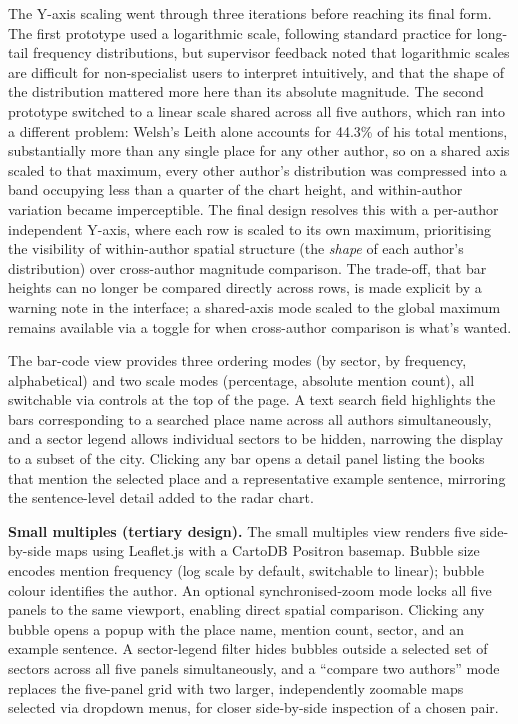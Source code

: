 \documentclass[logo,msc]{infthesis}
\begin{document}
The Y-axis scaling went through three iterations before reaching its final form. The first prototype used a logarithmic scale, following standard practice for long-tail frequency distributions, but supervisor feedback noted that logarithmic scales are difficult for non-specialist users to interpret intuitively, and that the shape of the distribution mattered more here than its absolute magnitude. The second prototype switched to a linear scale shared across all five authors, which ran into a different problem: Welsh's Leith alone accounts for 44.3\% of his total mentions, substantially more than any single place for any other author, so on a shared axis scaled to that maximum, every other author's distribution was compressed into a band occupying less than a quarter of the chart height, and within-author variation became imperceptible. The final design resolves this with a per-author independent Y-axis, where each row is scaled to its own maximum, prioritising the visibility of within-author spatial structure (the \emph{shape} of each author's distribution) over cross-author magnitude comparison. The trade-off, that bar heights can no longer be compared directly across rows, is made explicit by a warning note in the interface; a shared-axis mode scaled to the global maximum remains available via a toggle for when cross-author comparison is what's wanted.
 
The bar-code view provides three ordering modes (by sector, by frequency, alphabetical) and two scale modes (percentage, absolute mention count), all switchable via controls at the top of the page. A text search field highlights the bars corresponding to a searched place name across all authors simultaneously, and a sector legend allows individual sectors to be hidden, narrowing the display to a subset of the city. Clicking any bar opens a detail panel listing the books that mention the selected place and a representative example sentence, mirroring the sentence-level detail added to the radar chart.
 
\textbf{Small multiples (tertiary design).} The small multiples view renders five side-by-side maps using Leaflet.js with a CartoDB Positron basemap. Bubble size encodes mention frequency (log scale by default, switchable to linear); bubble colour identifies the author. An optional synchronised-zoom mode locks all five panels to the same viewport, enabling direct spatial comparison. Clicking any bubble opens a popup with the place name, mention count, sector, and an example sentence. A sector-legend filter hides bubbles outside a selected set of sectors across all five panels simultaneously, and a ``compare two authors'' mode replaces the five-panel grid with two larger, independently zoomable maps selected via dropdown menus, for closer side-by-side inspection of a chosen pair.
 
\end{document}
